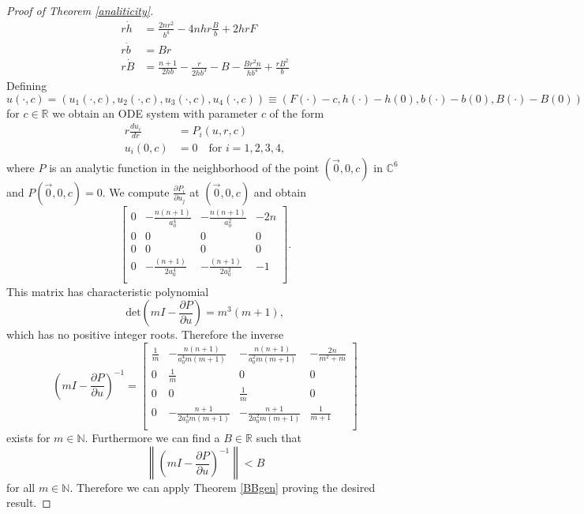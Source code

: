 \documentclass{amsart}
\theoremstyle{definition}
\theoremstyle{remark}
\numberwithin{equation}{section}
\newcommand{\R}{\mathbb{R}}  %
\newcommand{\N}{\mathbb{N}}
\newcommand{\norm}[1]{\left\lVert#1\right\rVert}
\begin{document}
\begin{proof}[Proof of Theorem \ref{analiticity}]
\begin{align*}
r\dot{h} &= \frac{2nr^2}{b^4} - 4nhr \frac{B}{b} + 2hrF \\
r\dot{b}&= Br \\
r\dot{B} &= \frac{n+1}{2hb} - \frac{r}{2hb^3} - B - \frac{Br^2n}{hb^4} + \frac{rB^2}{b}
\end{align*}
Defining $u(\cdot, c) = (u_1(\cdot,c),u_2(\cdot,c),u_3(\cdot,c),u_4(\cdot,c)) \equiv (F(\cdot)-c,h(\cdot)-h(0),b(\cdot)-b(0),B(\cdot)-B(0))$ for $c\in \mathbb{R}$ we obtain an ODE system with parameter $c$ of the form 
\begin{align}
\label{scheme}
r \frac{d u_i}{d r} &= P_i(u,r,c) \\ \nonumber
	u_i(0,c) & = 0 \quad \text{for }i = 1, 2, 3, 4,
\end{align}
where $P$ is an analytic function in the neighborhood of the point $(\vec{0},0, c)$ in $\mathbb{C}^6$ and $P(\vec{0},0,c) = 0$. We compute $\frac{\partial P_i} {\partial u_j}$ at $(\vec{0},0,c)$ and obtain
\begin{equation*}
\begin{bmatrix}
    0 & -\frac{n(n+1)}{a_0^4} & -\frac{n(n+1)}{a_0^2} & -2n \\
    0 & 0&0&0 \\
    0 & 0&0&0 \\
    0 & -\frac{(n+1)}{2a_0^4} & -\frac{(n+1)}{2a_0^2} & -1 \\
\end{bmatrix}.
\end{equation*}
This matrix has characteristic polynomial 
\begin{equation*}
\text{det}(m I - \frac{\partial P}{\partial u}) = m^3(m+1),
\end{equation*}
which has no positive integer roots. Therefore the inverse
\begin{equation}
\label{invmatrix}
\left(m I - \frac{\partial P}{\partial u}\right)^{-1} = \begin{bmatrix}
 \frac{1}{m} & -\frac{n (n+1)}{a_0^4 m (m+1)} & -\frac{n (n+1)}{a_0^2 m (m+1)} & -\frac{2
   n}{m^2+m} \\
 0 & \frac{1}{m} & 0 & 0 \\
 0 & 0 & \frac{1}{m} & 0 \\
 0 & -\frac{n+1}{2 a_0^4 m (m+1)} & -\frac{n+1}{2 a_0^2 m (m+1)} & \frac{1}{m+1} \\
 \end{bmatrix}
\end{equation}
exists for $m\in \N$. Furthermore we can find a $B\in \R$ such that 
\begin{equation*}
\norm{\left(m I - \frac{\partial P}{\partial u}\right)^{-1}} < B
\end{equation*}
for all $m\in\N$. Therefore we can apply Theorem \ref{BBgen} proving the desired result. 
\end{proof}
\end{document}
